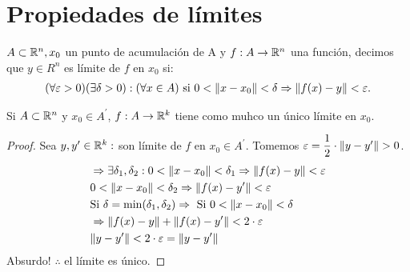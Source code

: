 \section{Propiedades de límites}

\begin{definition}[Límite]
  \(A \subset \mathbb{R}^n, x_0\) un punto de acumulación de A y \(f: A \to \mathbb{R}^n\) una función, decimos que \(y \in R^n\) es límite de \(f\) en \(x_0\) si: \begin{align*}
    (\forall \varepsilon > 0)(\exists \delta>0) : (\forall x \in A) \text{ si } 0 < \|x - x_0\| < \delta \Rightarrow \|f(x) - y\| < \varepsilon.
  \end{align*}
\end{definition}

\begin{lemma}
  Si \(A \subset \mathbb{R}^n\) y \(x_0 \in A^{\prime} \), \(f: A \to \mathbb{R}^k\) tiene como muhco un único límite en \(x_0\).
  \begin{proof}
    Sea \(y, y^{\prime} \in \mathbb{R}^k :\) son límite de \(f\) en \(x_0 \in A^{\prime} \). Tomemos \(\varepsilon = \dfrac{1}{2} \cdot \|y - y^{\prime}\| > 0\). \begin{align*}
       & \Rightarrow \exists \delta_1, \delta_2 : 0 < \| x - x_0 \| < \delta_1 \Rightarrow \|f(x) - y \| < \varepsilon \\
       & 0 < \|x - x_0\| < \delta_2 \Rightarrow \|f(x) - y^{\prime}\| < \varepsilon                                    \\
       & \text{Si } \delta = \min(\delta_1, \delta_2) \Rightarrow \text{ Si } 0 < \|x - x_0\| < \delta        \\
       & \Rightarrow \|f(x) - y\| + \|f(x) - y^{\prime}\| < 2 \cdot \varepsilon                                        \\
       & \|y - y^{\prime}\| < 2 \cdot \varepsilon = \|y - y^{\prime}\|
    \end{align*}
    Absurdo! \(\therefore \) el límite es único.
  \end{proof}
\end{lemma}

